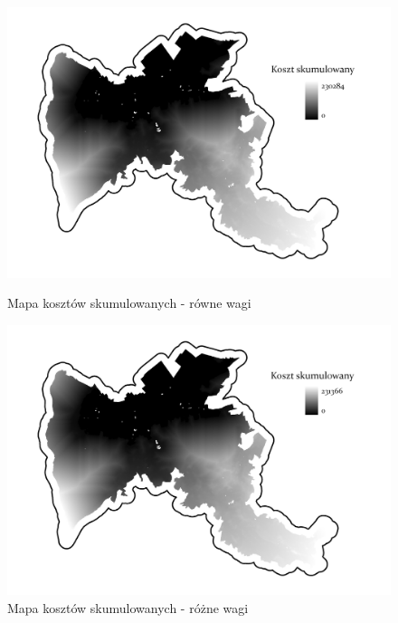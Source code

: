 \documentclass{article}
\begin{document}
\begin{figure}[H]
    \begin{minipage}[t]{0.48\textwidth}
        \centering
        \includegraphics[width=\linewidth]{img/cost-distance.jpg}
        \caption{Mapa kosztów skumulowanych - równe wagi}
        \label{fig:cost-distance-rowne}
    \end{minipage}
    \hfill
    \begin{minipage}[t]{0.48\textwidth}
        \centering
        \includegraphics[width=\linewidth]{img/roznewagi-cost-distance.jpg}
        \caption{Mapa kosztów skumulowanych - różne wagi}
        \label{fig:cost-distance-rozne}
    \end{minipage}
\end{figure}
\end{document}
